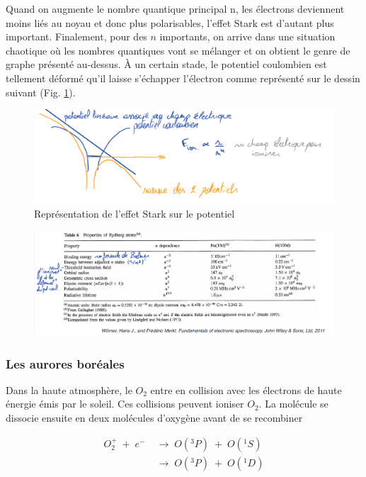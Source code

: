 Quand on augmente le nombre quantique principal n, les électrons deviennent moins liés au noyau et donc plus polarisables, l'effet Stark est d'autant plus important. Finalement, pour des $n$ importants, on arrive dans une situation chaotique où les nombres quantiques vont se mélanger et on obtient le genre de graphe présenté au-dessus. À un certain stade, le potentiel coulombien est tellement déformé qu'il laisse s'échapper l'électron comme représenté sur le dessin suivant (Fig. \ref{fig:fig_stark}).\\

\begin{figure}[H]
    \centering
    \includegraphics[width=\textwidth]{Images2/DessinStark.PNG}
    \caption{Représentation de l'effet Stark sur le potentiel}
    \label{fig:fig_stark}
\end{figure}
\begin{figure}[H]
    \centering
    \includegraphics[width=\textwidth]{Images2/TableauStark.PNG}
\end{figure}




\subsubsection{Les aurores boréales}

Dans la haute atmosphère, le $O_2$ entre en collision avec les électrons de haute énergie émis par le soleil. Ces collisions peuvent ioniser $O_2$. La molécule se dissocie ensuite en deux molécules d'oxygène avant de se recombiner

\begin{align*}
    O_2^+ \; + \; e^- \; &\longrightarrow \;O(^3P)\; +\; O(^1S)  \\
    &\longrightarrow\; O(^3P)\; +\; O(^1D)
\end{align*}

